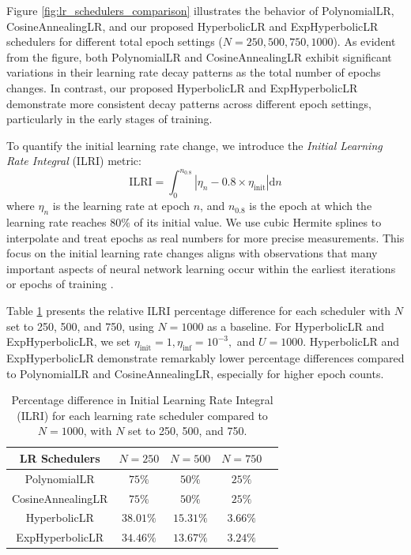 \documentclass{article}
\theoremstyle{plain}
\theoremstyle{definition}
\theoremstyle{remark}
\begin{document}
Figure \ref{fig:lr_schedulers_comparison} illustrates the behavior of PolynomialLR, CosineAnnealingLR, and our proposed HyperbolicLR and ExpHyperbolicLR schedulers for different total epoch settings ($N = 250, 500, 750, 1000$).
As evident from the figure, both PolynomialLR and CosineAnnealingLR exhibit significant variations in their learning rate decay patterns as the total number of epochs changes. In contrast, our proposed HyperbolicLR and ExpHyperbolicLR demonstrate more consistent decay patterns across different epoch settings, particularly in the early stages of training.

To quantify the initial learning rate change, we introduce the \textit{Initial Learning Rate Integral} (ILRI) metric:
\begin{equation}
   \text{ILRI} = \int_0^{n_{0.8}} \left|\eta_n - 0.8 \times \eta_\text{init} \right| \mathrm{d}n
\end{equation}
where $\eta_n$ is the learning rate at epoch $n$, and $n_{0.8}$ is the epoch at which the learning rate reaches $80\%$ of its initial value.
We use cubic Hermite splines to interpolate and treat epochs as real numbers for more precise measurements.
This focus on the initial learning rate changes aligns with observations that many important aspects of neural network learning occur within the earliest iterations or epochs of training \cite{frankle2020early,kalra2024phase}.

Table \ref{tab:ilri} presents the relative ILRI percentage difference for each scheduler with $N$ set to 250, 500, and 750, using $N=1000$ as a baseline. For HyperbolicLR and ExpHyperbolicLR, we set $\eta_\text{init}=1, \eta_\text{inf}=10^{-3},$ and $U=1000$. HyperbolicLR and ExpHyperbolicLR demonstrate remarkably lower percentage differences compared to PolynomialLR and CosineAnnealingLR, especially for higher epoch counts.

\begin{table}[t]
\caption{Percentage difference in Initial Learning Rate Integral (ILRI) for each learning rate scheduler compared to $N=1000$, with $N$ set to 250, 500, and 750.}
\label{tab:ilri}
\vskip 0.1in
\begin{center}
\begin{small}
\begin{sc}
\begin{tabular}{ccccc}
\toprule
LR Schedulers & $N=250$ & $N=500$ & $N=750$ \\
\midrule
PolynomialLR & $75\%$ & $50\%$ & $25\%$ \\
CosineAnnealingLR & $75\%$ & $50\%$ & $25\%$ \\
HyperbolicLR & $38.01\%$ & $15.31\%$ & $3.66\%$ \\
ExpHyperbolicLR & $34.46\%$ & $13.67\%$ & $3.24\%$ \\
\bottomrule
\end{tabular}
\end{sc}
\end{small}
\end{center}
\vskip -0.1in
\end{table}
\end{document}
